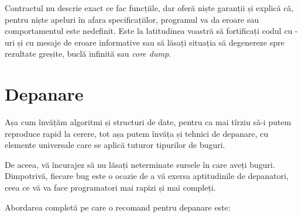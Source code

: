 \documentclass[../main.tex]{subfiles}
\begin{document}
Contractul nu descrie exact ce fac funcțiile, dar oferă niște garanții și explică că, pentru niște apeluri în afara specificațiilor, programul va da eroare sau comportamentul este nedefinit. Este la latitudinea voastră să fortificați codul cu -uri și cu mesaje de eroare informative sau să lăsați situația să degenereze spre rezultate greșite, buclă infinită sau \textit{core dump}.


\section{Depanare}

Așa cum învățăm algoritmi și structuri de date, pentru ca mai tîrziu să-i putem reproduce rapid la cerere, tot așa putem învăța și tehnici de depanare, cu elemente universale care se aplică tuturor tipurilor de buguri.

De aceea, vă încurajez să nu lăsați neterminate sursele în care aveți buguri. Dimpotrivă, fiecare bug este o ocazie de a vă exersa aptitudinile de depanatori, ceea ce vă va face programatori mai rapizi și mai compleți.

Abordarea completă pe care o recomand pentru depanare este:
\end{document}
